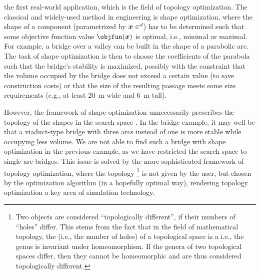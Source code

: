 
\label{chap:60topoOpt}

the first real-world application,
which is the field of topology optimization.
The classical and widely-used method in engineering is shape optimization,
where the shape of a component
(parametrized by $\*x \in \real^d$) has to be
determined such that some objective function value $\objfun(\*x)$ is optimal,
i.e., minimal or maximal.
For example, a bridge over a valley can be built in the shape of a
parabolic arc.
The task of shape optimization is then to choose the coefficients of the
parabola such that the bridge's stability is maximized,
possibly with the constraint that the volume occupied by the bridge
does not exceed a certain value (to save construction costs) or
that the size of the resulting passage meets some size requirements
(e.g., at least \SI{20}{\meter} wide and \SI{6}{\meter} tall).

However, the framework of shape optimization unnecessarily prescribes the
topology of the shapes in the search space \cite{Allaire16Towards}.
In the bridge example, it may well be that a viaduct-type bridge with
three arcs instead of one is more stable while occupying less volume.
We are not able to find such a bridge with shape optimization
in the previous example,
as we have restricted the search space to single-arc bridges.
This issue is solved by the more sophisticated
framework of topology optimization, where the topology%
\footnote{%
  Two objects are considered ``topologically different'',
  if their numbers of ``holes'' differ.
  This stems from the fact that in the field of mathematical topology,
  the  (i.e., the number of holes)
  of a topological space is a  i.e.,
  the genus is invariant under homeomorphism.
  If the genera of two topological spaces differ, then they cannot be
  homeomorphic and are thus considered topologically different.%
}
is not given by the user,
but chosen by the optimization algorithm (in a hopefully optimal way),
rendering topology optimization a key area of simulation technology.


